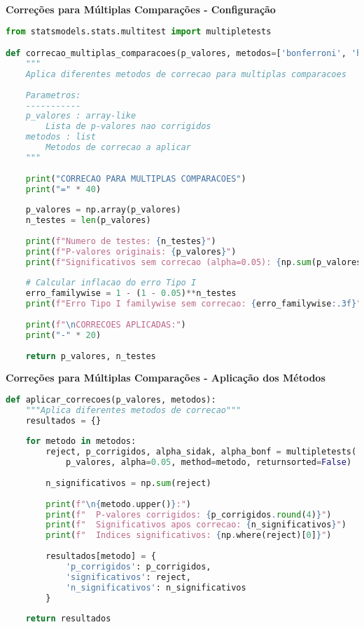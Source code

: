 \begin{examplebox}
\textbf{Correções para Múltiplas Comparações - Configuração}

\begin{lstlisting}[language=Python]
from statsmodels.stats.multitest import multipletests

def correcao_multiplas_comparacoes(p_valores, metodos=['bonferroni', 'holm', 'fdr_bh']):
    """
    Aplica diferentes metodos de correcao para multiplas comparacoes
    
    Parametros:
    -----------
    p_valores : array-like
        Lista de p-valores nao corrigidos
    metodos : list
        Metodos de correcao a aplicar
    """
    
    print("CORRECAO PARA MULTIPLAS COMPARACOES")
    print("=" * 40)
    
    p_valores = np.array(p_valores)
    n_testes = len(p_valores)
    
    print(f"Numero de testes: {n_testes}")
    print(f"P-valores originais: {p_valores}")
    print(f"Significativos sem correcao (alpha=0.05): {np.sum(p_valores < 0.05)}")
    
    # Calcular inflacao do erro Tipo I
    erro_familywise = 1 - (1 - 0.05)**n_testes
    print(f"Erro Tipo I familywise sem correcao: {erro_familywise:.3f}")
    
    print(f"\nCORRECOES APLICADAS:")
    print("-" * 20)
    
    return p_valores, n_testes
\end{lstlisting}
\end{examplebox}

\begin{examplebox}
\textbf{Correções para Múltiplas Comparações - Aplicação dos Métodos}

\begin{lstlisting}[language=Python]
def aplicar_correcoes(p_valores, metodos):
    """Aplica diferentes metodos de correcao"""
    resultados = {}
    
    for metodo in metodos:
        reject, p_corrigidos, alpha_sidak, alpha_bonf = multipletests(
            p_valores, alpha=0.05, method=metodo, returnsorted=False)
        
        n_significativos = np.sum(reject)
        
        print(f"\n{metodo.upper()}:")
        print(f"  P-valores corrigidos: {p_corrigidos.round(4)}")
        print(f"  Significativos apos correcao: {n_significativos}")
        print(f"  Indices significativos: {np.where(reject)[0]}")
        
        resultados[metodo] = {
            'p_corrigidos': p_corrigidos,
            'significativos': reject,
            'n_significativos': n_significativos
        }
    
    return resultados
\end{lstlisting}
\end{examplebox}

